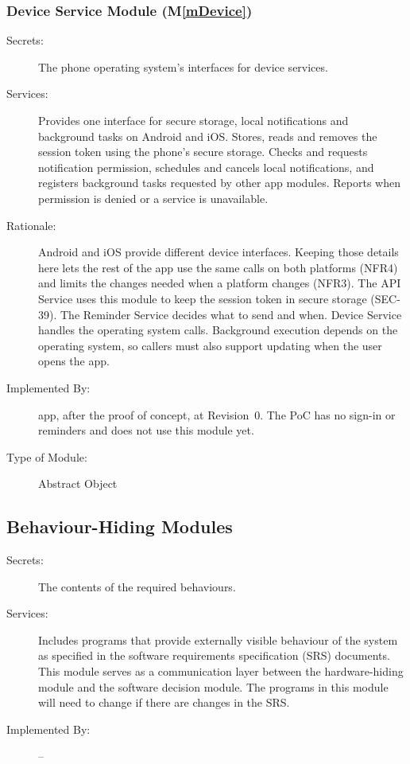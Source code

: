 \documentclass[12pt, titlepage]{article}
\newcommand{\mref}[1]{M\ref{#1}}
\begin{document}
\subsubsection{Device Service Module (\mref{mDevice})}
\begin{description}
\item[Secrets:] The phone operating system's interfaces for device services.

\item[Services:] Provides one interface for secure storage, local
notifications and background tasks on Android and iOS. Stores, reads and
removes the session token using the phone's secure storage. Checks and
requests notification permission, schedules and cancels local notifications,
and registers background tasks requested by other app modules. Reports
when permission is denied or a service is unavailable.

\item[Rationale:] Android and iOS provide different device interfaces.
Keeping those details here lets the rest of the app use the same calls on
both platforms (NFR4) and limits the changes needed when a platform changes (NFR3). The API Service uses this module to keep the session token in secure storage (SEC-39). The Reminder Service decides what to send and when. Device Service handles the operating system calls. Background execution depends on the operating system, so callers must also support updating when the user opens the app.

\item[Implemented By:] \progname{} app, after the proof of concept,
at Revision~0. The PoC has no sign-in or reminders and does not use this
module yet.

\item[Type of Module:] Abstract Object
\end{description}

\subsection{Behaviour-Hiding Modules}

\begin{description}
\item[Secrets:] The contents of the required behaviours.
\item[Services:] Includes programs that provide externally visible behaviour of
  the system as specified in the software requirements specification (SRS)
  documents. This module serves as a communication layer between the
  hardware-hiding module and the software decision module. The programs in this
  module will need to change if there are changes in the SRS.
\item[Implemented By:] --
\end{description}
\end{document}
